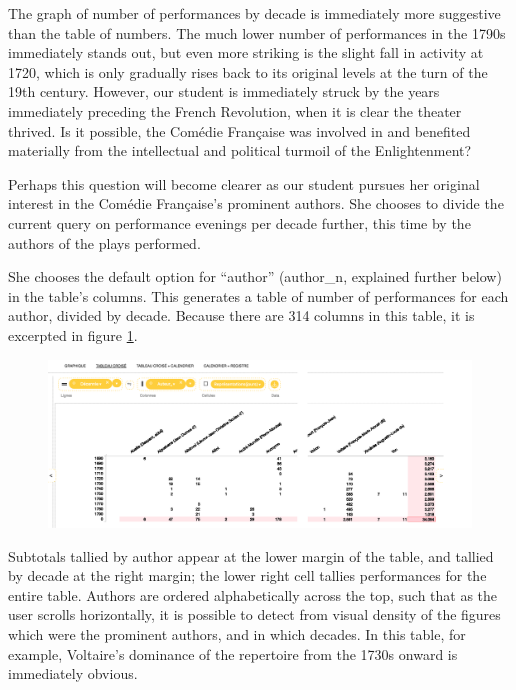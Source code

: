\documentclass[	DIV=calc,%
							paper=a4,%
							fontsize=11pt,%
							twocolumn]{scrartcl}	 					%
\begin{document}
The graph of number of performances by decade is immediately more suggestive than the table of numbers.  The much lower number of performances in the 1790s immediately stands out, but even more striking is the slight fall in activity at 1720, which is only gradually rises back to its original levels at the turn of the 19th century.  However, our student is immediately struck by the years immediately preceding the French Revolution, when it is clear the theater thrived.  Is it possible, the Comédie Française was involved in and benefited materially from the intellectual and political turmoil of the Enlightenment?

Perhaps this question will become clearer as our student pursues her original interest in the Comédie Française’s prominent authors.  She chooses to divide the current query on performance evenings per decade further, this time by the authors of the plays performed.

She chooses the default option for ``author'' (author\_n, explained further below) in the table’s columns.  This generates a table of number of performances for each author, divided by decade.  Because there are 314 columns in this table, it is excerpted in figure \ref{fig:stitched-author-table}.

\begin{figure}
  \centering
	\includegraphics[width=7in]{steps/stitched-author-table.png}
	\caption{}
	\label{fig:stitched-author-table}
\end{figure}

Subtotals tallied by author appear at the lower margin of the table, and tallied by decade at the right margin; the lower right cell tallies performances for the entire table.  Authors are ordered alphabetically across the top, such that as the user scrolls horizontally, it is possible to detect from visual density of the figures which were the prominent authors, and in which decades.  In this table, for example, Voltaire’s dominance of the repertoire from the 1730s onward is immediately obvious.
\end{document}
